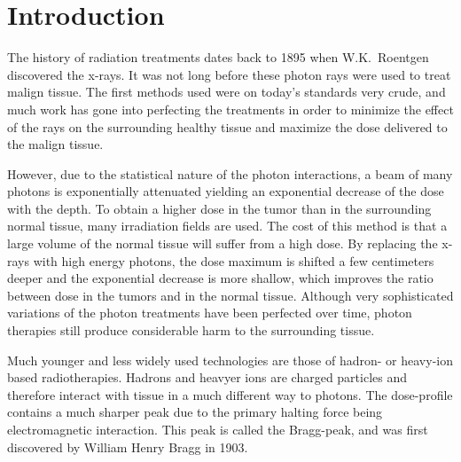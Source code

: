 \section{Introduction}
\thispagestyle{empty}
The history of radiation treatments dates back to 1895 when W.K.~Roentgen discovered the x-rays. It was not long before these photon rays were used to treat malign tissue. The first methods used were on today's standards very crude, and much work has gone into perfecting the treatments in order to minimize the effect of the rays on the surrounding healthy tissue and maximize the dose delivered to the malign tissue.

However, due to the statistical nature of the photon interactions, a beam of many photons is
exponentially attenuated yielding an exponential decrease of the dose with the depth. To
obtain a higher dose in the tumor than in the surrounding normal tissue, many irradiation
fields are used. The cost of this method is that a large volume of the normal tissue
will suffer from a high dose. By replacing the x-rays with high energy photons, the dose
maximum is shifted a few centimeters deeper and the exponential decrease is more shallow,
which improves the ratio between dose in the tumors and in the normal tissue. Although very sophisticated variations of the photon treatments have been perfected over time, photon therapies still produce considerable harm to the surrounding tissue. 

Much younger and less widely used technologies are those of hadron- or heavy-ion based radiotherapies. Hadrons and heavyer ions are charged particles and therefore interact with tissue in a much different way to photons. The dose-profile contains a much sharper peak due to the primary halting force being electromagnetic interaction. This peak is called the Bragg-peak, and was first discovered by William Henry Bragg in 1903.

